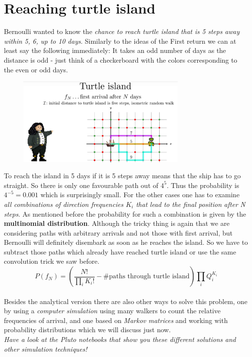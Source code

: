 \documentclass[12pt, a4paper]{scrartcl}
\begin{document}
\section*{Reaching turtle island}
Bernoulli wanted to know the \textit{chance to reach turtle island that is 5 steps away within 5, 6, up to 10 days}.
Similarly to the ideas of the First return we can at least say the following immediately: It takes an odd number of days as the distance is odd - just think of a checkerboard with the colors corresponding to the even or odd days.%
 \begin{figure}[H]
	\centering
	\includegraphics[width=0.75\textwidth]{5_7.png}
\end{figure}
To reach the island in 5 days if it is 5 steps away means that the ship has to go straight. 
So there is only one favourable path out of $4^5$. Thus the probability is
$4^{-5} = 0.001$ which is surprisingly small.
For the other cases one has to examine \textit{all combinations of direction frequencies $K_i$ that lead to the final position after N steps}.
As mentioned before the probability for such a combination is given by the \textbf{multinomial distribution}. Although the tricky thing is again that we are considering paths with arbitrary arrivals and not those with first arrival, but Bernoulli will definitely disembark as soon as he reaches the island. 
So we have to subtract those paths which already have reached turtle island or use the same convolution trick we saw before.
\begin{equation*}\boxed{P(f_N)=\left(\frac{N!}{\prod_i K_i!}-\#\text{paths through turtle island}\right)\prod_i Q_i^{K_i}
}\end{equation*}\\
Besides the analytical version there are also other ways to solve this problem, one by using a \textit{computer simulation} using many walkers to count the relative frequencies of arrival, and one based on \textit{Markov matrices} and working with probability distributions which we will discuss just now.\\ \textit{Have a look at the Pluto notebooks that show you these different solutions and other simulation techniques!}\\
\end{document}
